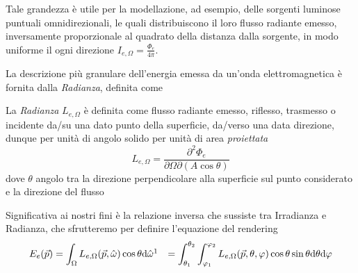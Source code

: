 Tale grandezza \`e utile per la modellazione, ad esempio, delle sorgenti luminose puntuali omnidirezionali, le quali distribuiscono il loro 
flusso radiante emesso, inversamente proporzionale al quadrato della distanza dalla sorgente, in modo uniforme il ogni direzione 
$I_{e,\Omega} = \frac{\Phi_e}{4\pi}$.\par
La descrizione pi\`u granulare dell'energia emessa da un'onda elettromagnetica \`e fornita dalla \textit{Radianza}, definita come
\label{chapter1:radianza}
\begin{definitionS}
	La \textit{Radianza} $L_{e,\Omega}$ \`e definita come flusso radiante emesso, riflesso, trasmesso o incidente da/su una dato punto della 
	superficie, da/verso una data direzione, dunque per unit\`a di angolo solido per unit\`a di area \textit{proiettata}
	\[ L_{e,\Omega} = \frac{\partial^2\Phi_e}{\partial\Omega\partial(A\cos\theta)} \]
	dove $\theta$ angolo tra la direzione perpendicolare alla superficie sul punto considerato e la direzione del flusso
\end{definitionS}
Significativa ai nostri fini \`e la relazione inversa che sussiste tra Irradianza e Radianza, che sfrutteremo per definire l'equazione del rendering
\begin{align}
	E_e(\vec{p}) &= \int_\Omega L_{e,\Omega}(\vec{p},\hat{\omega})\cos\theta\mathrm{d}\hat{\omega}\footnotemark 
				 &= \int_{\theta_1}^{\theta_2} \int_{\varphi_1}^{\varphi_2} L_{e,\Omega}(\vec{p}, \theta, \varphi)
						\cos\theta\sin\theta\mathrm{d}\theta\mathrm{d}\varphi
\end{align}
